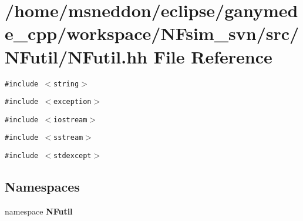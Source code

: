 \section{/home/msneddon/eclipse/ganymede\_\-cpp/workspace/NFsim\_\-svn/src/NFutil/NFutil.hh File Reference}
\label{NFutil_8hh}


{\tt \#include $<$string$>$}\par
{\tt \#include $<$exception$>$}\par
{\tt \#include $<$iostream$>$}\par
{\tt \#include $<$sstream$>$}\par
{\tt \#include $<$stdexcept$>$}\par
\subsection*{Namespaces}
\begin{CompactItemize}
\item 
namespace {\bf NFutil}
\end{CompactItemize}
